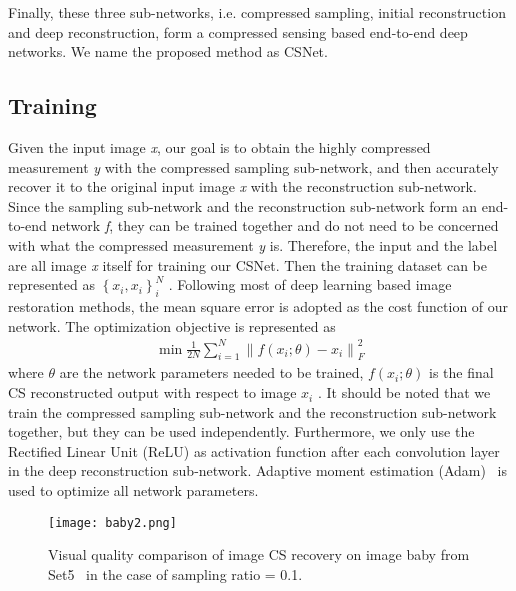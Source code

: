\documentclass[5pt]{article}
\begin{document}
Finally, these three sub-networks, i.e. compressed sampling, initial reconstruction and deep reconstruction, form a compressed sensing based end-to-end deep networks. We name the proposed method as CSNet.

\subsection{Training}

Given the input image \emph{x}, our goal is to obtain the highly compressed measurement \emph{y} with the compressed sampling sub-network, and then accurately recover it to the original input image \emph{x} with the reconstruction sub-network. Since the sampling sub-network and the reconstruction sub-network form an end-to-end network \emph{f}, they can be trained together and do not need to be concerned with what the compressed measurement \emph{y} is. Therefore, the input and the label are all image \emph{x} itself for training our CSNet. Then the training dataset can be represented as $\left\{ {{x_i},{x_i}} \right\}_i^N$ . Following most of deep learning based image restoration methods, the mean square error is adopted as the cost function of our network. The optimization objective is represented as
\begin{eqnarray}
\min \frac{1}{{2N}}\sum\nolimits_{i = 1}^N {\left\| {f\left( {{x_i};\theta } \right) - {x_i}} \right\|} _F^2
\end{eqnarray}
where $\theta $ are the network parameters needed to be trained, $f\left( {{x_i};\theta } \right)$  is the final CS reconstructed output with respect to image ${x_i}$ . It should be noted that we train the compressed sampling sub-network and the reconstruction sub-network together, but they can be used independently. Furthermore, we only use the Rectified Linear Unit (ReLU) as activation function after each convolution layer in the deep reconstruction sub-network. Adaptive moment estimation (Adam)~\cite{rf21} is used to optimize all network parameters.

\begin{figure*}[t]
\centering
\texttt{[image: baby2.png]}%
\vspace{-15pt}
\caption{\small {Visual quality comparison of image CS recovery on image baby from Set5~\cite{rf23} in the case of sampling ratio = 0.1.}}
\vspace{-5pt}
\label{fig:fig3}
\end{figure*}
\end{document}
